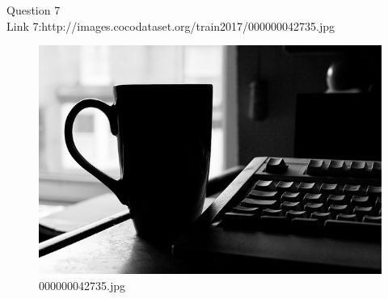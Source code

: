 Question 7\\
Link 7:http://images.cocodataset.org/train2017/000000042735.jpg
    \begin{figure}[h]
        \centering
        \includegraphics[width=0.8\linewidth]{../image set/easy/000000042735.jpg}
        \caption{000000042735.jpg}
    \end{figure}
